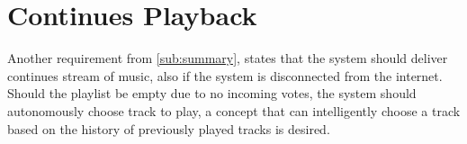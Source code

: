 \section{Continues Playback}

Another requirement from \cref{sub:summary}, states that the system should deliver continues stream of music, also if the system is disconnected from the internet. Should the playlist be empty due to no incoming votes, the system should autonomously choose track to play, a concept that can intelligently choose a track based on the history of previously played tracks is desired.